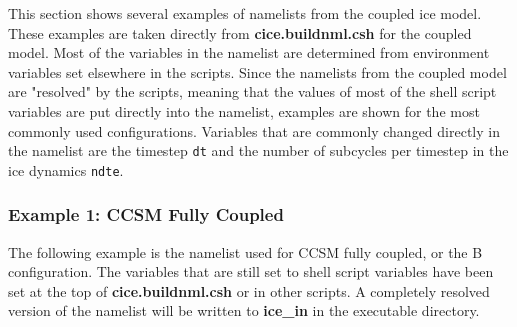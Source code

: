 
This section shows several examples of namelists from the coupled
ice model.  These examples are taken directly from {\bf cice.buildnml.csh}
for the coupled model.  
Most of the variables in the namelist are determined from environment variables
set elsewhere in the scripts. Since the namelists from the coupled model are
"resolved" by the scripts, meaning that the values of most of the shell script
variables are put directly into the namelist, examples are shown for the most
commonly used configurations.  Variables that are commonly changed directly in
the namelist are the timestep {\tt dt} and the number of subcycles per timestep
in the ice dynamics {\tt ndte}. 

\subsubsection {Example 1: CCSM Fully Coupled}
\label{example1_nml}

The following example is the namelist used for CCSM fully coupled, or
the B configuration.  The variables that are still set to shell script
variables have been set at the top of {\bf cice.buildnml.csh}
or in other scripts.  A completely resolved version of the namelist will
be written to {\bf ice\_in} in the executable directory.

